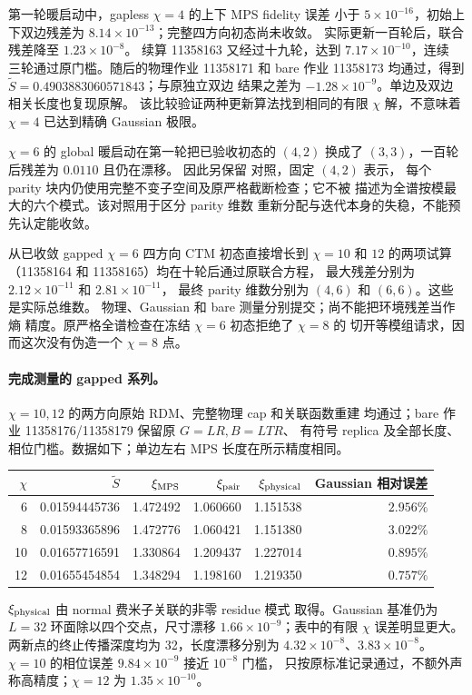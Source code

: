 第一轮暖启动中，gapless $\chi=4$ 的上下 MPS fidelity 误差
小于 $5\times10^{-16}$，初始上下双边残差为
$8.14\times10^{-13}$；完整四方向初态尚未收敛。
实际更新一百轮后，联合残差降至 $1.23\times10^{-8}$。
续算 11358163 又经过十九轮，达到 $7.17\times10^{-10}$，连续
三轮通过原门槛。随后的物理作业 11358171 和 bare 作业 11358173
均通过，得到 $\widetilde S=0.4903883060571843$；与原独立双边
结果之差为 $-1.28\times10^{-9}$。单边及双边相关长度也复现原解。
该比较验证两种更新算法找到相同的有限 $\chi$ 解，不意味着
$\chi=4$ 已达到精确 Gaussian 极限。

$\chi=6$ 的 global 暖启动在第一轮把已验收初态的 $(4,2)$
换成了 $(3,3)$，一百轮后残差为 $0.0110$ 且仍在漂移。
因此另保留  对照，固定 $(4,2)$ 表示，
每个 parity 块内仍使用完整不变子空间及原严格截断检查；它不被
描述为全谱按模最大的六个模式。该对照用于区分 parity 维数
重新分配与迭代本身的失稳，不能预先认定能收敛。

从已收敛 gapped $\chi=6$ 四方向 CTM 初态直接增长到 $\chi=10$
和 $12$ 的两项试算（11358164 和 11358165）均在十轮后通过原联合方程，
最大残差分别为 $2.12\times10^{-11}$ 和 $2.81\times10^{-11}$，
最终 parity 维数分别为 $(4,6)$ 和 $(6,6)$。这些是实际总维数。
物理、Gaussian 和 bare 测量分别提交；尚不能把环境残差当作熵
精度。原严格全谱检查在冻结 $\chi=6$ 初态拒绝了 $\chi=8$ 的
切开等模组请求，因而这次没有伪造一个 $\chi=8$ 点。


\paragraph{完成测量的 gapped 系列。}
$\chi=10,12$ 的两方向原始 RDM、完整物理 cap 和关联函数重建
均通过；bare 作业 11358176/11358179 保留原 $G=LR,B=LTR$、
有符号 replica 及全部长度、相位门槛。数据如下；单边左右 MPS
长度在所示精度相同。
\begin{center}
\begin{tabular}{rrrrrr}
\hline
$\chi$ & $\widetilde S$ & $\xi_{\rm MPS}$ & $\xi_{\rm pair}$ &
$\xi_{\rm physical}$ & Gaussian 相对误差\\
\hline
6 & 0.01594445736 & 1.472492 & 1.060660 & 1.151538 & $2.956\%$\\
8 & 0.01593365896 & 1.472776 & 1.060421 & 1.151380 & $3.022\%$\\
10 & 0.01657716591 & 1.330864 & 1.209437 & 1.227014 & $0.895\%$\\
12 & 0.01655454854 & 1.348294 & 1.198160 & 1.219350 & $0.757\%$\\
\hline
\end{tabular}
\end{center}
$\xi_{\rm physical}$ 由 normal 费米子关联的非零 residue 模式
取得。Gaussian 基准仍为 $L=32$ 环面除以四个交点，尺寸漂移
$1.66\times10^{-9}$；表中的有限 $\chi$ 误差明显更大。
两新点的终止传播深度均为 32，长度漂移分别为
$4.32\times10^{-8}$、$3.83\times10^{-8}$。
$\chi=10$ 的相位误差 $9.84\times10^{-9}$ 接近 $10^{-8}$ 门槛，
只按原标准记录通过，不额外声称高精度；$\chi=12$ 为
$1.35\times10^{-10}$。

